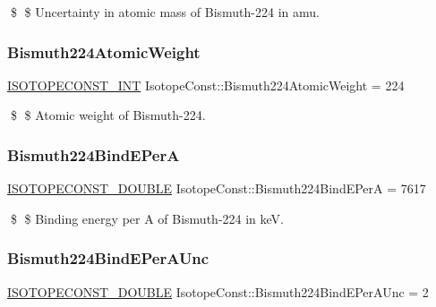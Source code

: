 \$ \$ Uncertainty in atomic mass of Bismuth-\/224 in amu. \mbox{\label{group___isotope_const-_bismuth-_bi224_gaff31f14100383733a32de90a12f86295}} 
\subsubsection{\texorpdfstring{Bismuth224\+Atomic\+Weight}{Bismuth224AtomicWeight}}
{\footnotesize\ttfamily \mbox{\hyperlink{group___isotope_const-_macros_ga5f18360b3e99483a35c32d789e62621c}{I\+S\+O\+T\+O\+P\+E\+C\+O\+N\+S\+T\+\_\+\+I\+NT}} Isotope\+Const\+::\+Bismuth224\+Atomic\+Weight = 224}

\$ \$ Atomic weight of Bismuth-\/224. \mbox{\label{group___isotope_const-_bismuth-_bi224_ga0964cc2c1beb5add0fd8b21eb7a3f43a}} 
\subsubsection{\texorpdfstring{Bismuth224\+Bind\+E\+PerA}{Bismuth224BindEPerA}}
{\footnotesize\ttfamily \mbox{\hyperlink{group___isotope_const-_macros_ga8f45a7272ce02c0b4c65c44636ed719a}{I\+S\+O\+T\+O\+P\+E\+C\+O\+N\+S\+T\+\_\+\+D\+O\+U\+B\+LE}} Isotope\+Const\+::\+Bismuth224\+Bind\+E\+PerA = 7617}

\$ \$ Binding energy per A of Bismuth-\/224 in keV. \mbox{\label{group___isotope_const-_bismuth-_bi224_ga3ed7291c1d195d13f3521cd1684fc89f}} 
\subsubsection{\texorpdfstring{Bismuth224\+Bind\+E\+Per\+A\+Unc}{Bismuth224BindEPerAUnc}}
{\footnotesize\ttfamily \mbox{\hyperlink{group___isotope_const-_macros_ga8f45a7272ce02c0b4c65c44636ed719a}{I\+S\+O\+T\+O\+P\+E\+C\+O\+N\+S\+T\+\_\+\+D\+O\+U\+B\+LE}} Isotope\+Const\+::\+Bismuth224\+Bind\+E\+Per\+A\+Unc = 2}

